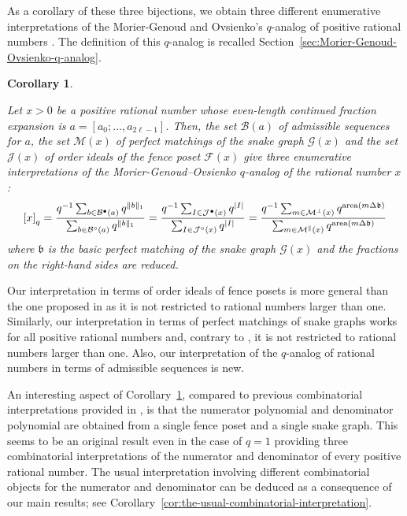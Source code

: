 \documentclass[a4paper,12pt]{amsart}
\newtheorem{maincorollary}[maintheorem]{Corollary}
\newcommand{\xx}{{x}}
\newcommand{\Bcal}{{\mathcal{B}}}
\newcommand{\Fcal}{{\mathcal{F}}}
\newcommand{\Gcal}{{\mathcal{G}}}
\newcommand{\Jcal}{{\mathcal{J}}}
\newcommand{\Mcal}{{\mathcal{M}}}
\newcommand{\bfrak}{{\mathfrak{b}}}
\newcommand{\0}{\mathtt{0}}
\newcommand{\1}{\mathtt{1}}
\newcommand{\2}{\mathtt{2}}
\newcommand{\3}{\mathtt{3}}
\newcommand{\carreplein}{{\perp}}
\newcommand{\carrevide}{{\parallel}}
\DeclareMathOperator{\area}{area}
\newcommand{\size}[1]{
    {|#1|}                 %
}
\begin{document}
As a corollary of these three bijections,
we obtain three different enumerative interpretations of the
Morier-Genoud and Ovsienko's
$q$-analog of positive rational numbers \cite{MR4073883}.
The definition of this $q$-analog is recalled Section~\ref{sec:Morier-Genoud-Ovsienko-q-analog}.

\newcommand\MainCorollaryE{
    Let $\xx>0$ be a positive rational number
    whose even-length continued fraction expansion
    is $a=[a_0;\dots,a_{2\ell-1}]$.
    Then,
    the set $\Bcal(a)$ of admissible sequences for $a$,
    the set $\Mcal(\xx)$ of perfect matchings of the snake graph $\Gcal(\xx)$ and
    the set $\Jcal(\xx)$ of order ideals of the fence poset $\Fcal(\xx)$
    give three enumerative interpretations
    of the Morier-Genoud--Ovsienko $q$-analog of the rational number $\xx$:
\[
\left[x\right]_q
=
\frac{q^{-1}\sum_{b\in \Bcal^\bullet(a)} q^{\Vert b\Vert_1}}
            {\sum_{b\in \Bcal^\circ  (a)} q^{\Vert b\Vert_1}}
=
\frac{q^{-1}\sum_{I\in \Jcal^\bullet(\xx)} q^{\size{I}}}
            {\sum_{I\in \Jcal^\circ  (\xx)} q^{\size{I}}}
=
\frac{q^{-1}\sum_{m\in \Mcal^\carreplein(\xx)} q^{\area(m\Delta\bfrak)}}
            {\sum_{m\in \Mcal^\carrevide (\xx)} q^{\area(m\Delta\bfrak)}}
\]
where $\bfrak$ is the basic perfect matching of the snake graph $\Gcal(\xx)$
and the fractions on the right-hand sides are reduced.
}

\begin{maincorollary}\label{cor:three-combinatorial-interpretation-of-q-rational}
\MainCorollaryE
\end{maincorollary}


Our interpretation in terms of order ideals of fence posets is more general
than the one proposed in \cite{MR4073883} as it is not restricted to rational
numbers larger than one.
Similarly, our interpretation in terms of perfect matchings of snake graphs
works for all positive rational numbers and, contrary to \cite{MR3778183,MR4058266},
it is not restricted to rational numbers larger than one.
Also, our interpretation of the $q$-analog of rational numbers in terms of
admissible sequences is new.

An interesting aspect of
Corollary~\ref{cor:three-combinatorial-interpretation-of-q-rational},
compared to previous combinatorial interpretations provided in
\cite{MR3778183,MR4058266,MR4073883,musiker_higher_2023},
is that the numerator polynomial and denominator polynomial are obtained
from a single fence poset and a single snake graph.
This seems to be an original result even in the case of $q=1$ providing three
combinatorial interpretations of the numerator and denominator of every
positive rational number.
The usual interpretation involving different combinatorial objects
for the numerator and denominator can be deduced as a consequence
of our main results; see Corollary~\ref{cor:the-usual-combinatorial-interpretation}.
\end{document}

